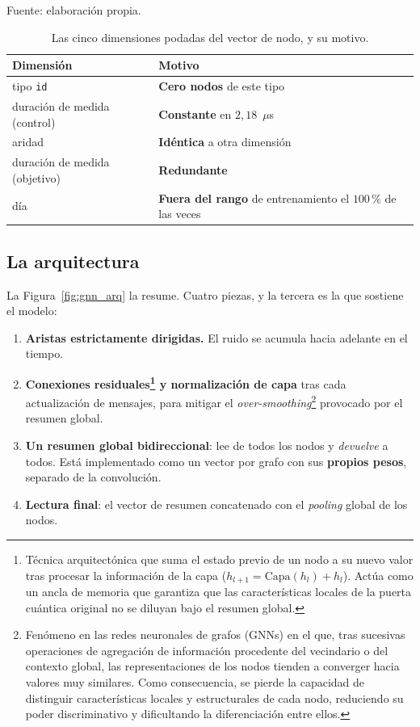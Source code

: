 \begin{table}[htbp]
    \centering
    \caption{Las cinco dimensiones podadas del vector de nodo, y su motivo.}
    \label{tab:poda}
    {\footnotesize
    Fuente: elaboración propia. \begin{tabular}{@{}lp{}@{}}
        \toprule
        \textbf{Dimensión} & \textbf{Motivo} \\
        \midrule
        tipo \texttt{id} & \textbf{Cero nodos} de este tipo \\
        duración de medida (control) & \textbf{Constante} en $2{,}18$~$\mu$s \\
        aridad & \textbf{Idéntica} a otra dimensión \\
        duración de medida (objetivo) & \textbf{Redundante} \\
        día & \textbf{Fuera del rango} de entrenamiento el $100$\,\% de las veces \\
        \bottomrule
    \end{tabular}}
\end{table}

\subsection*{La arquitectura}

La Figura~\ref{fig:gnn_arq} la resume. Cuatro piezas, y la tercera es la que sostiene el
modelo:

\begin{enumerate}
    \item \textbf{Aristas estrictamente dirigidas.} El ruido se acumula hacia adelante en el
          tiempo.
    \item \textbf{Conexiones residuales\footnote{Técnica arquitectónica que suma el estado previo de un nodo a su nuevo valor tras procesar la información de la capa ($h_{l+1} = \text{Capa}(h_l) + h_l$). Actúa como un ancla de memoria que garantiza que las características locales de la puerta cuántica original no se diluyan bajo el resumen global.} y normalización de capa} tras cada actualización de mensajes, para mitigar el \textit{over-smoothing}\footnote{Fenómeno en las redes neuronales de grafos (GNNs) en el que, tras sucesivas operaciones de agregación de información procedente del vecindario o del contexto global, las representaciones de los nodos tienden a converger hacia valores muy similares. Como consecuencia, se pierde la capacidad de distinguir características locales y estructurales de cada nodo, reduciendo su poder discriminativo y dificultando la diferenciación entre ellos.} provocado por el resumen global.
    \item \textbf{Un resumen global bidireccional}: lee de todos los nodos y \emph{devuelve} a
          todos. Está implementado como un vector
          por grafo con sus \textbf{propios pesos}, separado de la convolución.
    \item \textbf{Lectura final}: el vector de resumen concatenado con el \textit{pooling}
          global de los nodos.
\end{enumerate}

